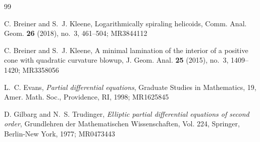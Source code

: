 \documentclass{amsart}
\begin{document}

\begin{thebibliography}{99}




C. Breiner and S.~J. Kleene, Logarithmically spiraling helicoids, Comm. Anal. Geom. {\bf 26} (2018), no.~3, 461--504; MR3844112

C. Breiner and S.~J. Kleene, A minimal lamination of the interior of a positive cone with quadratic curvature blowup, J. Geom. Anal. {\bf 25} (2015), no.~3, 1409--1420; MR3358056

L.~C. Evans, {\it Partial differential equations}, Graduate Studies in Mathematics, 19, Amer. Math. Soc., Providence, RI, 1998; MR1625845
 
 D. Gilbarg and N.~S. Trudinger, {\it Elliptic partial differential equations of second order}, Grundlehren der Mathematischen Wissenschaften, Vol. 224, Springer, Berlin-New York, 1977; MR0473443
 








\end{thebibliography}
\end{document}
